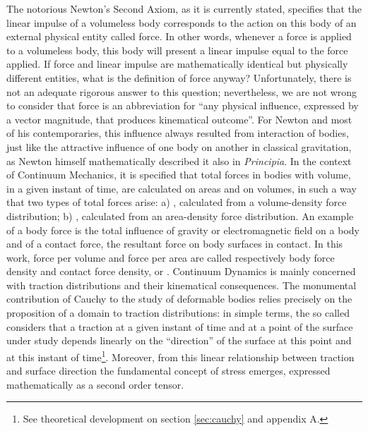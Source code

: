 The notorious Newton's Second Axiom, as it is currently stated, specifies that the linear impulse of a volumeless body corresponds to the action on this body of an external physical entity called force. In other words, whenever a force is applied to a volumeless body, this body will present a linear impulse equal to the force applied. If force and linear impulse are mathematically identical but physically different entities, what is the definition of force anyway?  Unfortunately, there is not an adequate rigorous answer to this question; nevertheless, we are not wrong to consider that force is an abbreviation for ``any physical influence, expressed by a vector magnitude, that produces kinematical outcome''. For Newton and most of his contemporaries, this influence always resulted from interaction of bodies, just like the attractive influence of one body on another in classical gravitation, as Newton himself mathematically described it also in \emph{Principia}. In the context of Continuum Mechanics, it is specified that total forces in bodies with volume, in a given instant of time, are calculated on areas and on volumes, in such a way that two types of total forces arise: a) , calculated from a volume-density force distribution; b) , calculated from an area-density force distribution. An example of a body force is the total influence of gravity or electromagnetic field on a body and of a contact force, the resultant force on body surfaces in contact. In this work, force per volume and force per area are called respectively body force density and contact force density, or . Continuum Dynamics is mainly concerned with traction distributions and their kinematical consequences. The monumental contribution of Cauchy to the study of deformable bodies relies precisely on the proposition of a domain to traction distributions: in simple terms, the so called  considers that a traction at a given instant of time and at a point of the surface under study depends linearly on the ``direction'' of the surface at this point and at this instant of time\footnote{See theoretical development on section \ref{sec:cauchy} and appendix A.}. Moreover, from this linear relationship between traction and surface direction the fundamental concept of stress emerges, expressed mathematically as a second order tensor.     




